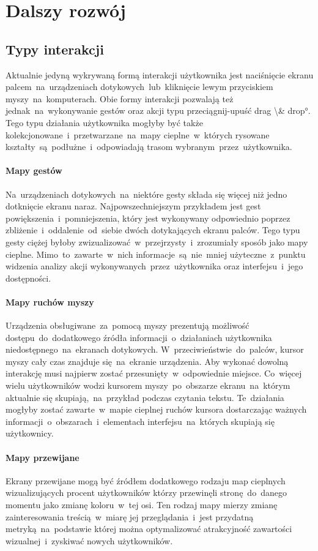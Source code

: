 \section{Dalszy rozwój}
\label{sec:future_work}

\subsection{Typy interakcji}
Aktualnie jedyną wykrywaną formą interakcji użytkownika jest naciśnięcie ekranu palcem~na~urządzeniach dotykowych~lub~kliknięcie lewym przyciskiem myszy~na~komputerach. Obie formy interakcji pozwalają też jednak~na~wykonywanie gestów oraz akcji typu przeciągnij-upuść \ang{drag \& drop}. Tego typu działania użytkownika mogłyby być także kolekcjonowane~i~przetwarzane~na~mapy cieplne~w~których rysowane kształty~są~podłużne~i~odpowiadają trasom wybranym~przez~użytkownika.

\paragraph{Mapy gestów} Na~urządzeniach dotykowych~na~niektóre gesty składa się więcej niż jedno dotknięcie ekranu naraz. Najpowszechniejszym przykładem jest gest powiększenia~i~pomniejszenia, który jest wykonywany odpowiednio poprzez zbliżenie~i~oddalenie~od~siebie dwóch dotykających ekranu palców. Tego typu gesty ciężej byłoby zwizualizować~w~przejrzysty~i~zrozumiały sposób jako mapy cieplne. Mimo~to~zawarte~w~nich informacje~są~nie~mniej użyteczne~z~punktu widzenia analizy akcji wykonywanych~przez~użytkownika oraz interfejsu~i~jego dostępności.

\paragraph{Mapy ruchów myszy} Urządzenia obsługiwane~za~pomocą myszy prezentują możliwość dostępu~do~dodatkowego źródła informacji~o~działaniach użytkownika niedostępnego~na~ekranach dotykowych. W~przeciwieństwie~do~palców, kursor myszy cały czas znajduje się~na~ekranie urządzenia. Aby wykonać dowolną interakcję musi najpierw zostać przesunięty~w~odpowiednie miejsce. Co~więcej wielu użytkowników wodzi kursorem myszy~po~obszarze ekranu~na~którym aktualnie się skupiają,~na~przykład podczas czytania tekstu. Te~działania mogłyby zostać zawarte~w~mapie cieplnej ruchów kursora dostarczając ważnych informacji~o~obszarach~i~elementach interfejsu~na~których skupiają się użytkownicy.

\paragraph{Mapy przewijane} Ekrany przewijane mogą być źródłem dodatkowego rodzaju map cieplnych wizualizujących procent użytkowników którzy przewinęli stronę~do~danego momentu jako zmianę koloru~w~tej osi. Ten rodzaj mapy mierzy zmianę zainteresowania treścią~w~miarę jej przeglądania~i~jest przydatną metryką~na~podstawie której można optymalizować atrakcyjność zawartości wizualnej~i~zyskiwać nowych użytkowników.

